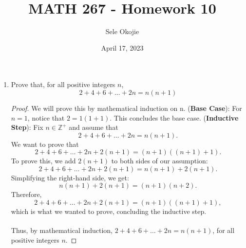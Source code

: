 \documentclass{article}
\title{MATH 267 - Homework 10}
\author{Sele Okojie}
\date{April 17, 2023}
\begin{document}
    \maketitle
    
    \begin{enumerate}

    	\item Prove that, for all positive integers $n$,
    		\[
    			2 + 4 + 6 + \dots + 2n = n(n+1)
    		\]
                \begin{proof}
                    We will prove this by mathematical induction on n.
                    \ppar (\textbf{Base Case}): For $n = 1$, notice that $2 = 1(1 + 1)$. This concludes the base case.
                    \ppar (\textbf{Inductive Step}): Fix $n\in\mathbb{Z}^+$ and assume that 
                        \[
    			             2 + 4 + 6 + \dots + 2n = n(n+1).
    		          \]
                    \ppar We want to prove that
                        \[
    			             2 + 4 + 6 + \dots + 2n + 2(n+1) = (n+1)((n+1) + 1).
    		          \]
                    \ppar To prove this, we add $2(n+1)$ to both sides of our assumption:
                        \[
    			             2 + 4 + 6 + \dots + 2n + 2(n+1) = n(n + 1) + 2(n + 1).
    		          \]
                    \ppar Simplifying the right-hand side, we get:
                        \[
    			             n(n + 1) + 2(n + 1) = (n + 1)(n + 2).
    		          \]
                    \ppar Therefore, 
                    \[
                        2 + 4 + 6 + \dots + 2n + 2(n+1) = (n+1)((n+1) + 1), 
                    \]
                        which is what we wanted to prove, concluding the inductive step.
                    \\\\ Thus, by mathematical induction, $2 + 4 + 6 + \dots + 2n = n(n+1)$, for all positive integers $n$.
                \end{proof}


\end{enumerate}
\end{document}
